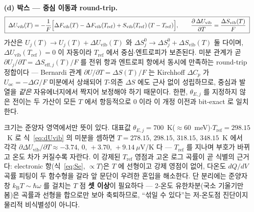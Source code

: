 \documentclass[11pt,a4paper]{article}
\newcommand{\oc}{\mathrm{oc}}
\newcommand{\vib}{\mathrm{vib}}
\newcommand{\eff}{\mathrm{eff}}
\newcommand{\kB}{k_{\mathrm B}}
\begin{document}
\textbf{(d) 박스 --- 중심 이동과 round-trip.}
\begin{equation}
\boxed{\;
\Delta U_\vib(T)=-\frac1F\Bigl[\Delta F_\vib(T)-\Delta F_\vib(T_\mathrm{ref})+S_\vib(T_\mathrm{ref})\,(T-T_\mathrm{ref})\Bigr],
\qquad
\frac{\partial\,\Delta U_\vib}{\partial T}=\frac{\Delta S_\vib(T)}{F}\;}
\label{eq:dUvib}
\end{equation}
가산은 $U_j(T)\to U_j(T)+\Delta U_\vib(T)$ 와 $\Delta S^0_j\to\Delta S^0_j+\Delta S_\vib(T)$ 둘 다이며,
$\Delta U_\vib(T_\mathrm{ref})=0$ 이 자동이라 $T_\mathrm{ref}$ 에서 중심$\cdot$엔트로피가 보존된다. 미분 관계가 곧
$\partial U_j/\partial T=\Delta S_{\eff,j}(T)/F$ 를 전위 항과 엔트로피 항에서 동시에 만족하는 round-trip 정합이다 --- Bernardi
관계 $\partial U/\partial T=\Delta S(T)/F$ 는 Kirchhoff $\Delta C_p$ 가 $U_\oc{=}{-}\Delta G/F$ 미분에서 상쇄되어 $T$-의존
$\Delta S$ 에도 근사 없이 성립하므로, 중심과 발열을 \emph{같은} 자유에너지에서 짝지어 보정해야 하기 때문이다.
한편,
$\theta_{E,j}$ 를 지정하지 않은 전이는 두 가산이 모든 $T$ 에서 항등적으로 $0$ 이라 이 개정 이전과 bit-exact 로
일치한다.

크기는 준양자 영역에서만 뜻이 있다. 대표값 $\theta_{E,j}=700$~K($\approx60$~meV)$\cdot$$T_\mathrm{ref}=298.15$~K 로
식~\eqref{eq:dUvib} 의 미분을 셈하면 $T=278.15,\,298.15,\,318.15,\,348.15$~K 에서 각각 $\partial\Delta U_\vib/\partial T\approx
-3.74,\,0,\,+3.70,\,+9.14~\mu$V/K 다 --- $T_\mathrm{ref}$ 를 지나며 부호가 바뀌고 온도 차가 커질수록 자란다.
이 강제된 $T_\mathrm{ref}$ 영점과 고온 로그 곡률이 곧 식별의 근거다: electronic 항(식~\eqref{eq:Se}, $\propto T$)은
$T$ 에 선형이고 강제 영점이 없어, 다온도 $dQ/dV$ 곡률 피팅이 두 함수형을 갈라 앞 문단이 우려한 혼입을 해소한다.
단 분리에는 준양자 창 $\kB T\!\sim\!\hbar\omega$ 를 걸치는 $T$ 점 \textbf{셋 이상}이 필요하다 --- 2-온도 유한차분(국소
기울기만 봄)은 곡률과 선형을 합으로만 보아 축퇴하므로, ``섞일 수 있다''는 저-온도점 진단이지 물리적 비식별성이 아니다.
\end{document}
